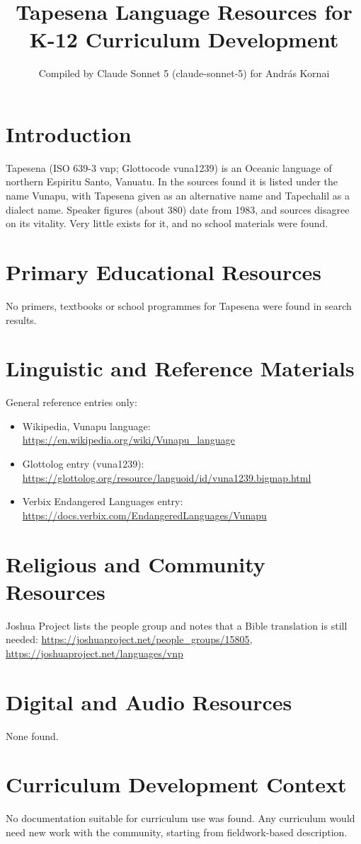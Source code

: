 \documentclass[12pt]{article}
\title{Tapesena Language Resources for K-12 Curriculum Development}
\author{Compiled by Claude Sonnet 5 (claude-sonnet-5) for Andr\'as Kornai}
\date{}
\begin{document}
\maketitle

\section{Introduction}
Tapesena (ISO 639-3 vnp; Glottocode vuna1239) is an Oceanic language of northern Espiritu Santo, Vanuatu. In the sources found it is listed under the name Vunapu, with Tapesena given as an alternative name and Tapechalil as a dialect name. Speaker figures (about 380) date from 1983, and sources disagree on its vitality. Very little exists for it, and no school materials were found.

\section{Primary Educational Resources}
No primers, textbooks or school programmes for Tapesena were found in search results.

\section{Linguistic and Reference Materials}
General reference entries only:
\begin{itemize}
\item Wikipedia, Vunapu language: \url{https://en.wikipedia.org/wiki/Vunapu_language}
\item Glottolog entry (vuna1239): \url{https://glottolog.org/resource/languoid/id/vuna1239.bigmap.html}
\item Verbix Endangered Languages entry: \url{https://docs.verbix.com/EndangeredLanguages/Vunapu}
\end{itemize}

\section{Religious and Community Resources}
Joshua Project lists the people group and notes that a Bible translation is still needed:
\url{https://joshuaproject.net/people_groups/15805}, \url{https://joshuaproject.net/languages/vnp}

\section{Digital and Audio Resources}
None found.

\section{Curriculum Development Context}
No documentation suitable for curriculum use was found. Any curriculum would need new work with the community, starting from fieldwork-based description.
\end{document}
